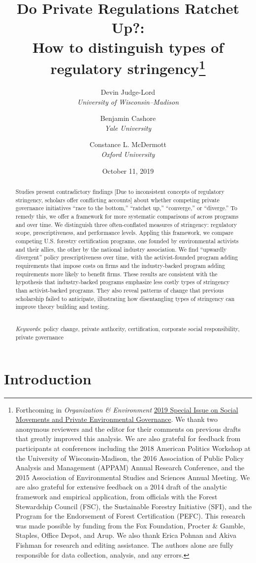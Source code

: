 \documentclass[
      12pt,
            Review ]{article}
\title{Do Private Regulations Ratchet Up?: 
           \\ How to distinguish types of regulatory stringency\thanks{Forthcoming in \emph{Organization \& Environment} \href{https://journals.sagepub.com/doi/full/10.1177/108602661985378}{2019 Special Issue on Social Movements and Private Environmental Governance}. We thank two anonymous reviewers and the editor for their comments on previous drafts that greatly improved this analysis. We are also grateful for feedback from participants at conferences including the 2018 American Politics Workshop at the University of Wisconsin-Madison, the 2016 Association of Public Policy Analysis and Management (APPAM) Annual Research Conference, and the 2015 Association of Environmental Studies and Sciences Annual Meeting. We are also grateful for extensive feedback on a 2014 draft of the analytic framework and empirical application, from officials with the Forest Stewardship Council (FSC), the Sustainable Forestry Initiative (SFI), and the Program for the Endorsement of Forest Certification (PEFC). This research was made possible by funding from the Fox Foundation, Procter \& Gamble, Staples, Office Depot, and Arup. We also thank Erica Pohnan and Akiva Fishman for research and editing assistance. The authors alone are fully responsible for data collection, analysis, and any errors.}}
\author{ %
            Devin Judge-Lord  \\ \emph{University of Wisconsin--Madison} 
             \and 
            Benjamin Cashore  \\ \emph{Yale University} 
             \and 
            Constance L. McDermott  \\ \emph{Oxford University} 
            }
\date{October 11, 2019}
\begin{document}
 


  \maketitle




  \begin{abstract}
    \noindent Studies present contradictory findings {[}Due to inconsistent concepts of regulatory stringency, scholars offer conflicting accounts{]} about whether competing private governance initiatives ``race to the bottom,'' ``ratchet up,'' ``converge,'' or ``diverge.'' To remedy this, we offer a framework for more systematic comparisons of across programs and over time. We distinguish three often-conflated measures of stringency: regulatory scope, prescriptiveness, and performance levels. Appling this framework, we compare competing U.S. forestry certification programs, one founded by environmental activists and their allies, the other by the national industry association. We find ``upwardly divergent'' policy prescriptiveness over time, with the activist-founded program adding requirements that impose costs on firms and the industry-backed program adding requirements more likely to benefit firms. These results are consistent with the hypothesis that industry-backed programs emphasize less costly types of stringency than activist-backed programs. They also reveal patterns of change that previous scholarship failed to anticipate, illustrating how disentangling types of stringency can improve theory building and testing. 

          \hfill \\ 
      \noindent \emph{Keywords}: policy change, private authority, certification, corporate social responsibility, private governance 
    
  \end{abstract}










\noindent 
      \doublespacing 
    \newpage

\hypertarget{introduction}{%
\section{Introduction}\label{introduction}}
\end{document}
